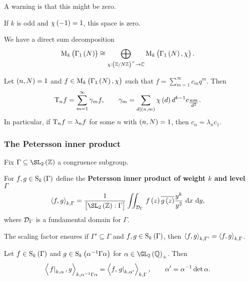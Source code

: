 A warning is that this might be zero.

\begin{example*}
If $ k $ is odd and $ \chi\br{-1} = 1 $, this space is zero.
\end{example*}

\pagebreak

We have a direct sum decomposition
$$ \M_k\br{\Gamma_1\br{N}} \cong \bigoplus_{\chi : \br{\ZZ / N\ZZ}^\times \to \CC} \M_k\br{\Gamma_1\br{N}, \chi}. $$

\begin{proposition}
Let $ \br{n, N} = 1 $ and $ f \in \M_k\br{\Gamma_1\br{N}, \chi} $ such that $ f = \sum_{m = 1}^\infty c_mq^m $. Then
$$ \T_nf = \sum_{m = 1}^\infty \gamma_mf, \qquad \gamma_m = \sum_{d \mid \br{n, m}} \chi\br{d}d^{k - 1}c_{\tfrac{nm}{d^2}}. $$
In particular, if $ \mathrm{T}_nf = \lambda_nf $ for some $ n $ with $ \br{n, N} = 1 $, then $ c_n = \lambda_nc_1 $.
\end{proposition}

\subsubsection{The Petersson inner product}

Fix $ \Gamma \subseteq \SL_2\br{\ZZ} $ a congruence subgroup.

\begin{definition}
For $ f, g \in \S_k\br{\Gamma} $ define the \textbf{Petersson inner product of weight $ k $ and level $ \Gamma $}
$$ \abr{f, g}_{k, \Gamma} = \dfrac{1}{\sbr{\SL_2\br{\ZZ} : \Gamma}}\iintd{\DDD_\Gamma}{f\br{z}\overline{g\br{z}}\dfrac{y^k}{y^2}}{x}{y}, $$
where $ \mathcal{D}_\Gamma $ is a fundamental domain for $ \Gamma $.
\end{definition}

\begin{note*}
The scaling factor ensures if $ \Gamma' \subseteq \Gamma $ and $ f, g \in \S_k\br{\Gamma} $, then $ \left\langle f, g \right\rangle_{k, \Gamma'} = \left\langle f, g \right\rangle_{k, \Gamma} $.
\end{note*}

\begin{proposition}
Let $ f \in \S_k\br{\Gamma} $ and $ g \in \S_k\br{\alpha^{-1}\Gamma\alpha} $ for $ \alpha \in \GL_2\br{\QQ}_+ $. Then
$$ \left\langle \left. f \right|_{k, \alpha}, g \right\rangle_{k, \alpha^{-1}\Gamma\alpha} = \left\langle f, \left. g \right|_{k, \alpha'} \right\rangle_{k, \Gamma}, \qquad \alpha' = \alpha^{-1}\det \alpha. $$
\end{proposition}

